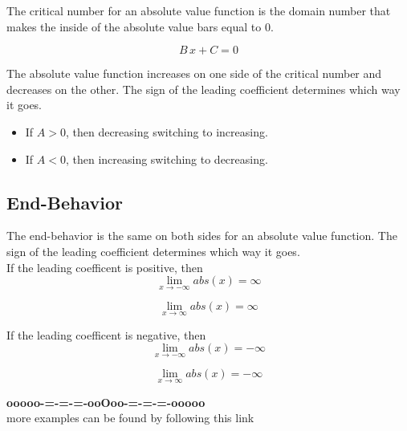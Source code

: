 \documentclass{ximera}
\begin{document}
The critical number for an absolute value function is the domain number that makes the inside of the absolute value bars equal to $0$.


\[
B \, x + C = 0
\]


The absolute value function increases on one side of the critical number and decreases on the other.  The sign of the leading coefficient determines which way it goes. \\




\begin{itemize}
  \item If $A > 0$, then decreasing switching to increasing.
  \item If $A < 0$, then increasing switching to decreasing.
\end{itemize}









\subsection*{End-Behavior}


The end-behavior is the same on both sides for an absolute value function. The sign of the leading coefficient determines which way it goes.\\


If the leading coefficent is positive, then 
\[
\lim_{x \to -\infty} abs(x) = \infty 
\]
 
\[
\lim_{x \to \infty} abs(x) = \infty 
\]







If the leading coefficent is negative, then 
\[
\lim_{x \to -\infty} abs(x) = -\infty 
\]
 
\[
\lim_{x \to \infty} abs(x) = -\infty 
\]





















\begin{center}
\textbf{\textcolor{green!50!black}{ooooo-=-=-=-ooOoo-=-=-=-ooooo}} \\

more examples can be found by following this link\\ 

\end{center}
\end{document}
